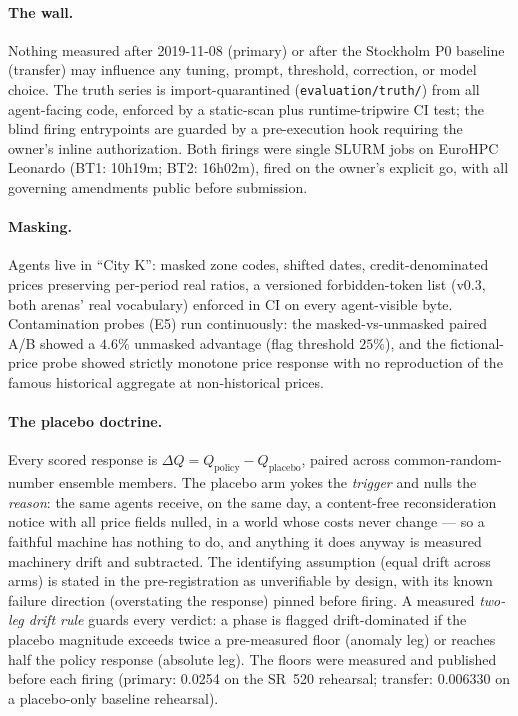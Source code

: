 \documentclass[11pt]{article}
\newcommand{\dq}{\Delta Q}
\begin{document}
\paragraph{The wall.} Nothing measured after 2019-11-08 (primary) or
after the Stockholm P0 baseline (transfer) may influence any tuning,
prompt, threshold, correction, or model choice. The truth series is
import-quarantined ({\tt evaluation/truth/}) from all agent-facing code,
enforced by a static-scan plus runtime-tripwire CI test; the blind
firing entrypoints are guarded by a pre-execution hook requiring the
owner's inline authorization. Both firings were single SLURM jobs on
EuroHPC Leonardo (BT1: 10h19m; BT2: 16h02m), fired on the owner's
explicit go, with all governing amendments public before submission.

\paragraph{Masking.} Agents live in ``City K'': masked zone codes,
shifted dates, credit-denominated prices preserving per-period real
ratios, a versioned forbidden-token list (v0.3, both arenas' real
vocabulary) enforced in CI on every agent-visible byte. Contamination
probes (E5) run continuously: the masked-vs-unmasked paired A/B showed
a $4.6\%$ unmasked advantage (flag threshold $25\%$), and the
fictional-price probe showed strictly monotone price response with no
reproduction of the famous historical aggregate at non-historical
prices.

\paragraph{The placebo doctrine.} Every scored response is
$\dq = Q_{\text{policy}} - Q_{\text{placebo}}$, paired across
common-random-number ensemble members. The placebo arm yokes the
\emph{trigger} and nulls the \emph{reason}: the same agents receive, on
the same day, a content-free reconsideration notice with all price
fields nulled, in a world whose costs never change --- so a faithful
machine has nothing to do, and anything it does anyway is measured
machinery drift and subtracted. The identifying assumption (equal drift
across arms) is stated in the pre-registration as unverifiable by
design, with its known failure direction (overstating the response)
pinned before firing. A measured \emph{two-leg drift rule} guards every
verdict: a phase is flagged drift-dominated if the placebo magnitude
exceeds twice a pre-measured floor (anomaly leg) or reaches half the
policy response (absolute leg). The floors were measured and published
before each firing (primary: 0.0254 on the SR~520 rehearsal; transfer:
0.006330 on a placebo-only baseline rehearsal).
\end{document}
